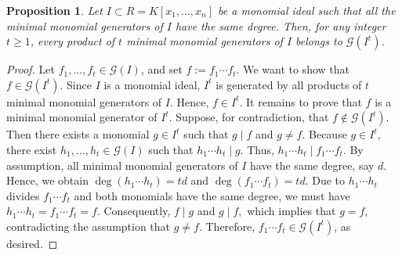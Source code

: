 \documentclass[11pt]{amsart}
\newtheorem{proposition}[theorem]{Proposition}
\begin{document}


\begin{proposition}\label{min.gens.2}
Let $I\subset R=K[x_1,\ldots,x_n]$ be a monomial ideal such that all the
minimal monomial generators of $I$ have the same degree. Then, for any
integer $t\geq 1$, every product of $t$ minimal monomial generators of $I$
belongs to $\mathcal{G}(I^t)$.
\end{proposition}

 \begin{proof}
Let \(f_1,\ldots,f_t\in \mathcal{G}(I)\), and set $f:=f_1\cdots f_t.$ We want to show that \(f\in \mathcal{G}(I^t)\). 
Since \(I\) is a monomial ideal, \(I^t\) is generated by all products of \(t\) minimal monomial generators of \(I\). Hence, 
 $f\in I^t .$ It remains to prove that \(f\) is a minimal monomial generator of \(I^t\).
Suppose, for contradiction, that \(f\notin \mathcal{G}(I^t)\). Then there  exists a monomial \(g\in I^t\) such that
 $g\mid f$ and $g\neq f.$ Because \(g\in I^t\), there exist \(h_1,\ldots,h_t\in\mathcal{G}(I)\) such
that $h_1\cdots h_t\mid g.$  Thus, $h_1\cdots h_t\mid f_1\cdots f_t.$ 
By assumption, all minimal monomial generators of \(I\) have the same
degree, say \(d\). Hence, we obtain $\deg(h_1\cdots h_t)=td$ and $\deg(f_1\cdots f_t)=td.$ 
Due to  \(h_1\cdots h_t\) divides \(f_1\cdots f_t\) and both monomials have the
same degree, we must have $h_1\cdots h_t=f_1\cdots f_t=f.$ Consequently,
  $f\mid g$ and $g\mid f,$ which implies that $g=f$, contradicting the assumption that \(g\neq f\). 
Therefore, $f_1\cdots f_t\in \mathcal{G}(I^t)$, as desired.  
\end{proof}

\end{document}
